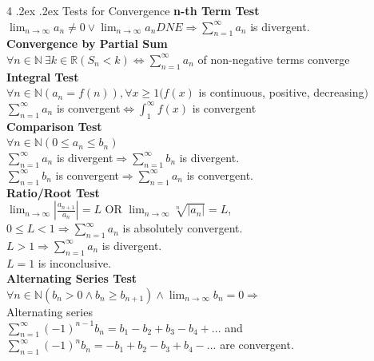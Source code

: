 \documentclass[10pt,landscape,a4paper]{article}
\makeatletter
\renewcommand{\section}{\@startsection{section}{1}{0mm}%
                                {.2ex}%
                                {.2ex}%
                                {\color{myblue}\sffamily\small\bfseries}}
\makeatother
\begin{document}
\begin{multicols*}{4}
\section{Tests for Convergence}
\textbf{n-th Term Test}\\
$\lim_{n\to\infty}a_n\neq0\vee\lim_{n\to\infty}a_n DNE\Rightarrow\sum_{n=1}^{\infty}a_n$ is divergent.\\
\textbf{Convergence by Partial Sum}\\
$\forall n\in\mathbb{N}\ \exists k\in\mathbb{R}(S_n<k)\Leftrightarrow\sum_{n=1}^{\infty}a_n$ of non-negative terms converge\\
\textbf{Integral Test}\\
$\forall n\in\mathbb{N}(a_n=f(n)), \forall x\ge1(f(x)$ is continuous, positive, decreasing$)$\\
$\sum_{n=1}^{\infty}a_n$ is convergent$\Leftrightarrow\int_{1}^{\infty}f(x)$ is convergent\\
\textbf{Comparison Test}\\
$\forall n\in\mathbb{N}(0\le a_n\le b_n)$\\
$\sum_{n=1}^{\infty}a_n$ is divergent$\Rightarrow\sum_{n=1}^{\infty}b_n$ is divergent.\\
$\sum_{n=1}^{\infty}b_n$ is convergent$\Rightarrow\sum_{n=1}^{\infty}a_n$ is convergent.\\
\textbf{Ratio/Root Test}\\
$\lim_{n\to\infty}\left|\frac{a_{n+1}}{a_n}\right|=L$ OR $\lim_{n\to\infty}\sqrt[n]{\left|{a_n}\right|}=L$,\\
$0\le L<1\Rightarrow\sum_{n=1}^{\infty}a_n$ is absolutely convergent.\\
$L>1\Rightarrow\sum_{n=1}^{\infty}a_n$ is divergent.\\
$L=1$ is inconclusive.\\
\textbf{Alternating Series Test}\\
$\forall n\in\mathbb{N}(b_n>0\wedge b_n\ge b_{n+1})\wedge \lim_{n\to\infty}b_n=0\Rightarrow$\\
Alternating series\\
$\sum_{n=1}^{\infty}(-1)^{n-1}b_n=b_1-b_2+b_3-b_4+...$ and \\
$\sum_{n=1}^{\infty}(-1)^nb_n=-b_1+b_2-b_3+b_4-...$ are convergent.

\end{multicols*}
\end{document}
